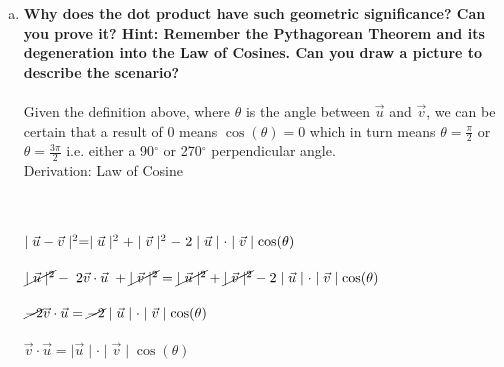 \documentclass{article}
\begin{document}
\begin{enumerate}[b.]
	\item \textbf{Why does the dot product have such geometric significance? Can you prove it? Hint: Remember the Pythagorean Theorem and its degeneration into the Law of Cosines. Can
you draw a picture to describe the scenario? }\\
	\\
	Given the definition above, where $\theta$ is the angle between $\vec{u}$ and $\vec{v}$, we can be certain that a result of $0$ means $\cos(\theta)=0$ which in turn means $\theta=\frac{\pi}{2}$ or $\theta=\frac{3\pi}{2}$ i.e. either a 90$^{\circ}$ or 270$^{\circ}$ perpendicular angle.\\
	
	Derivation: Law of Cosine\\
	\\
\\
	$\mid\vec{u}-\vec{v}\mid^{2} = \mid\vec{u}\mid^{2} + \mid\vec{v}\mid^{2}-\hspace{.1cm}2\mid\vec{u}\mid\cdot\mid\vec{v}\mid\cos(\theta)$\\
\\
$\cancel{\mid\vec{u}\mid^{2}}-\hspace{.1cm}2\vec{v}\cdot\vec{u}\hspace{.1cm}+\cancel{\mid\vec{v}\mid^{2}}=\cancel{\mid\vec{u}\mid^{2}} + \cancel{\mid\vec{v}\mid^{2}}-2\mid\vec{u}\mid\cdot\mid\vec{v}\mid\cos(\theta)$\\
\\
$\cancel{-2}\vec{v}\cdot\vec{u} = \cancel{-2}\mid\vec{u}\mid\cdot\mid\vec{v}\mid\cos(\theta)$\\
\\
$\vec{v}\cdot\vec{u} = \mid\vec{u}\mid\cdot\mid\vec{v}\mid\cos(\theta)$\\
\end{enumerate}
\end{document}
